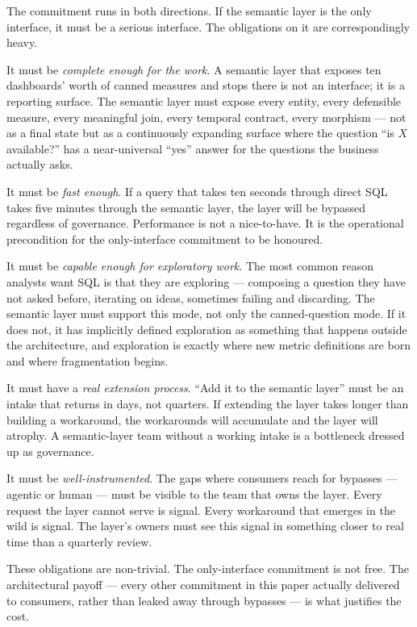 \documentclass[11pt,a4paper]{article}
\begin{document}
The commitment runs in both directions. If the semantic layer is the only interface, it must be a serious interface. The obligations on it are correspondingly heavy.

It must be \emph{complete enough for the work}. A semantic layer that exposes ten dashboards' worth of canned measures and stops there is not an interface; it is a reporting surface. The semantic layer must expose every entity, every defensible measure, every meaningful join, every temporal contract, every morphism --- not as a final state but as a continuously expanding surface where the question ``is $X$ available?'' has a near-universal ``yes'' answer for the questions the business actually asks.

It must be \emph{fast enough}. If a query that takes ten seconds through direct SQL takes five minutes through the semantic layer, the layer will be bypassed regardless of governance. Performance is not a nice-to-have. It is the operational precondition for the only-interface commitment to be honoured.

It must be \emph{capable enough for exploratory work}. The most common reason analysts want SQL is that they are exploring --- composing a question they have not asked before, iterating on ideas, sometimes failing and discarding. The semantic layer must support this mode, not only the canned-question mode. If it does not, it has implicitly defined exploration as something that happens outside the architecture, and exploration is exactly where new metric definitions are born and where fragmentation begins.

It must have a \emph{real extension process}. ``Add it to the semantic layer'' must be an intake that returns in days, not quarters. If extending the layer takes longer than building a workaround, the workarounds will accumulate and the layer will atrophy. A semantic-layer team without a working intake is a bottleneck dressed up as governance.

It must be \emph{well-instrumented}. The gaps where consumers reach for bypasses --- agentic or human --- must be visible to the team that owns the layer. Every request the layer cannot serve is signal. Every workaround that emerges in the wild is signal. The layer's owners must see this signal in something closer to real time than a quarterly review.

These obligations are non-trivial. The only-interface commitment is not free. The architectural payoff --- every other commitment in this paper actually delivered to consumers, rather than leaked away through bypasses --- is what justifies the cost.
\end{document}
